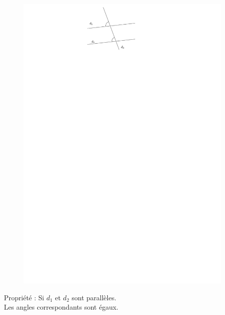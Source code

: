\documentclass{beamer}
\begin{document}
\begin{frame}
\begin{columns}[t]
\begin{column}{5cm}
    \end{column}
    \begin{column}{5cm}
      \begin{figure}[H]
        \centering
        \includegraphics[width=0.6\linewidth]{5x10-angles/sources/corres-2.pdf}
      \end{figure}
      \begin{block}{Propriété :}	
        Si $d_1$ et $d_2$ sont \alert{parallèles}.\\
        Les angles correspondants sont \alert{égaux}.
      \end{block}   
    \end{column}
  \end{columns}    
\end{frame}
\end{document}
